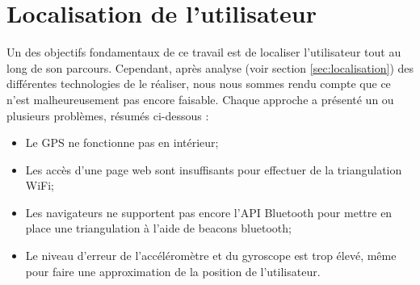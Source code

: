 \section{Localisation de l'utilisateur}
Un des objectifs fondamentaux de ce travail est de localiser l'utilisateur tout au long de son parcours. Cependant, après analyse (voir section \ref{sec:localisation}) des différentes technologies de le réaliser, nous nous sommes rendu compte que ce n'est malheureusement pas encore faisable. Chaque approche a présenté un ou plusieurs problèmes, résumés ci-dessous :
\begin{itemize}
	\item Le GPS ne fonctionne pas en intérieur;
	\item Les accès d'une page web sont insuffisants pour effectuer de la triangulation WiFi;
	\item Les navigateurs ne supportent pas encore l'API Bluetooth pour mettre en place une triangulation à l'aide de beacons bluetooth;
	\item Le niveau d'erreur de l'accéléromètre et du gyroscope est trop élevé, même pour faire une approximation de la position de l'utilisateur.
\end{itemize}


